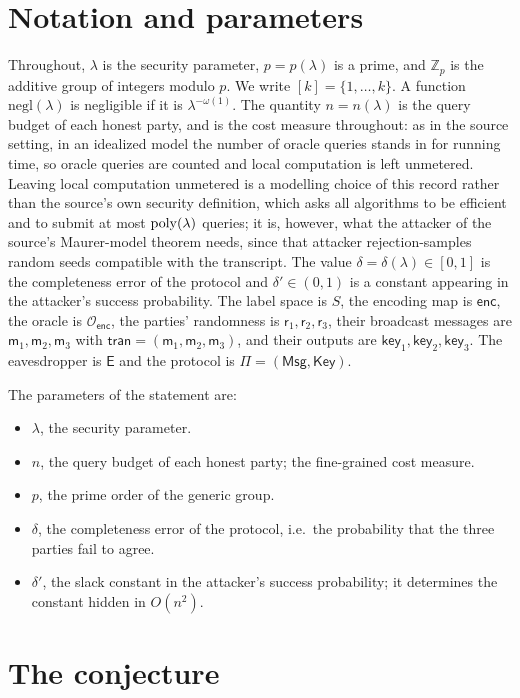 \documentclass{aicr-conjecture}
\newcommand{\Zp}{\mathbb{Z}_{p}}
\newcommand{\enc}{\mathsf{enc}}
\newcommand{\Oenc}{\mathcal{O}_{\enc}}
\newcommand{\Msg}{\mathsf{Msg}}
\newcommand{\Key}{\mathsf{Key}}
\newcommand{\tran}{\mathsf{tran}}
\newcommand{\keyv}{\mathsf{key}}
\newcommand{\rv}{\mathsf{r}}
\newcommand{\mv}{\mathsf{m}}
\newcommand{\Ev}{\mathsf{E}}
\newcommand{\negl}{\mathrm{negl}}
\begin{document}
\section{Notation and parameters}\label{sec:notation}

Throughout, $\lambda$ is the security parameter, $p = p(\lambda)$ is a
prime, and $\Zp$ is the additive group of integers modulo $p$. We write
$[k] = \{1,\dots,k\}$. A function $\negl(\lambda)$ is negligible if it
is $\lambda^{-\omega(1)}$. The quantity $n = n(\lambda)$ is the query
budget of each honest party, and is the cost measure throughout: as in
the source setting, in an idealized model the number of oracle queries
stands in for running time, so oracle queries are counted and local
computation is left unmetered. Leaving local computation unmetered is a
modelling choice of this record rather than the source's own security
definition, which asks all algorithms to be efficient and to submit at
most $\mathrm{poly}(\lambda)$ queries; it is, however, what the attacker of the
source's Maurer-model theorem needs, since that attacker
rejection-samples random seeds compatible with the transcript. The value
$\delta = \delta(\lambda) \in [0,1]$ is the completeness error of the
protocol and $\delta' \in (0,1)$ is a constant appearing in the
attacker's success probability. The label space is $S$, the encoding map
is $\enc$, the oracle is $\Oenc$, the parties' randomness is
$\rv_{1},\rv_{2},\rv_{3}$, their broadcast messages are
$\mv_{1},\mv_{2},\mv_{3}$ with $\tran = (\mv_{1},\mv_{2},\mv_{3})$, and
their outputs are $\keyv_{1},\keyv_{2},\keyv_{3}$. The eavesdropper is
$\Ev$ and the protocol is $\Pi = (\Msg,\Key)$.

The parameters of the statement are:
\begin{itemize}
\item $\lambda$, the security parameter.
\item $n$, the query budget of each honest party; the fine-grained cost
  measure.
\item $p$, the prime order of the generic group.
\item $\delta$, the completeness error of the protocol, i.e.\ the
  probability that the three parties fail to agree.
\item $\delta'$, the slack constant in the attacker's success
  probability; it determines the constant hidden in $O(n^{2})$.
\end{itemize}

\section{The conjecture}\label{sec:conjectures}
\end{document}
